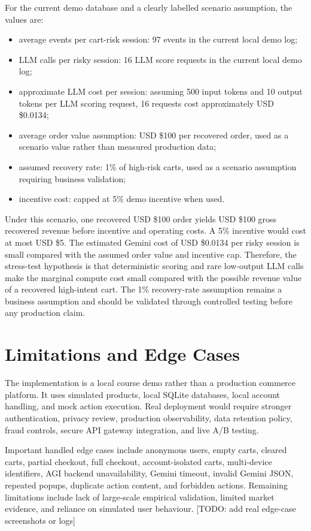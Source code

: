\documentclass{article}
\begin{document}
For the current demo database and a clearly labelled scenario assumption, the values are:
\begin{itemize}[leftmargin=*]
  \item average events per cart-risk session: 97 events in the current local demo log;
  \item LLM calls per risky session: 16 LLM score requests in the current local demo log;
  \item approximate LLM cost per session: assuming 500 input tokens and 10 output tokens per LLM scoring request, 16 requests cost approximately USD \$0.0134;
  \item average order value assumption: USD \$100 per recovered order, used as a scenario value rather than measured production data;
  \item assumed recovery rate: 1\% of high-risk carts, used as a scenario assumption requiring business validation;
  \item incentive cost: capped at 5\% demo incentive when used.
\end{itemize}

Under this scenario, one recovered USD \$100 order yields USD \$100 gross recovered revenue before incentive and operating costs. A 5\% incentive would cost at most USD \$5. The estimated Gemini cost of USD \$0.0134 per risky session is small compared with the assumed order value and incentive cap. Therefore, the stress-test hypothesis is that deterministic scoring and rare low-output LLM calls make the marginal compute cost small compared with the possible revenue value of a recovered high-intent cart. The 1\% recovery-rate assumption remains a business assumption and should be validated through controlled testing before any production claim.

\section{Limitations and Edge Cases}
The implementation is a local course demo rather than a production commerce platform. It uses simulated products, local SQLite databases, local account handling, and mock action execution. Real deployment would require stronger authentication, privacy review, production observability, data retention policy, fraud controls, secure API gateway integration, and live A/B testing.

Important handled edge cases include anonymous users, empty carts, cleared carts, partial checkout, full checkout, account-isolated carts, multi-device identifiers, AGI backend unavailability, Gemini timeout, invalid Gemini JSON, repeated popups, duplicate action content, and forbidden actions. Remaining limitations include lack of large-scale empirical validation, limited market evidence, and reliance on simulated user behaviour. [TODO: add real edge-case screenshots or logs]
\end{document}
